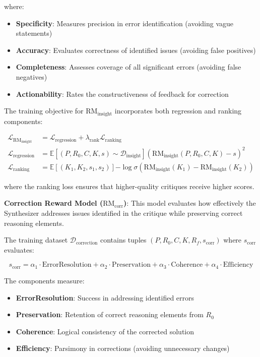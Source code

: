 \documentclass[10pt,twocolumn]{article}
\newcommand{\RMinsight}{\text{RM}_{\text{insight}}}
\newcommand{\RMcorr}{\text{RM}_{\text{corr}}}
\newcommand{\expectation}[1]{\mathbb{E}\left[#1\right]}
\begin{document}
where:
\begin{itemize}[leftmargin=*]
\item \textbf{Specificity}: Measures precision in error identification (avoiding vague statements)
\item \textbf{Accuracy}: Evaluates correctness of identified issues (avoiding false positives)
\item \textbf{Completeness}: Assesses coverage of all significant errors (avoiding false negatives)
\item \textbf{Actionability}: Rates the constructiveness of feedback for correction
\end{itemize}

The training objective for $\RMinsight$ incorporates both regression and ranking components:

\begin{align}
\mathcal{L}_{\RMinsight} &= \mathcal{L}_{\text{regression}} + \lambda_{\text{rank}} \mathcal{L}_{\text{ranking}} \\
\mathcal{L}_{\text{regression}} &= \expectation{(P,R_0,C,K,s) \sim \mathcal{D}_{\text{insight}}}{(\RMinsight(P,R_0,C,K) - s)^2} \\
\mathcal{L}_{\text{ranking}} &= \expectation{(K_1, K_2, s_1, s_2)}{-\log \sigma(\RMinsight(K_1) - \RMinsight(K_2))}
\end{align}

where the ranking loss ensures that higher-quality critiques receive higher scores.

\textbf{Correction Reward Model ($\RMcorr$)}: This model evaluates how effectively the Synthesizer addresses issues identified in the critique while preserving correct reasoning elements.

The training dataset $\mathcal{D}_{\text{correction}}$ contains tuples $(P, R_0, C, K, R_f, s_{\text{corr}})$ where $s_{\text{corr}}$ evaluates:

\begin{equation}
s_{\text{corr}} = \alpha_1 \cdot \text{ErrorResolution} + \alpha_2 \cdot \text{Preservation} + \alpha_3 \cdot \text{Coherence} + \alpha_4 \cdot \text{Efficiency}
\end{equation}

The components measure:
\begin{itemize}[leftmargin=*]
\item \textbf{ErrorResolution}: Success in addressing identified errors
\item \textbf{Preservation}: Retention of correct reasoning elements from $R_0$
\item \textbf{Coherence}: Logical consistency of the corrected solution
\item \textbf{Efficiency}: Parsimony in corrections (avoiding unnecessary changes)
\end{itemize}
\end{document}

